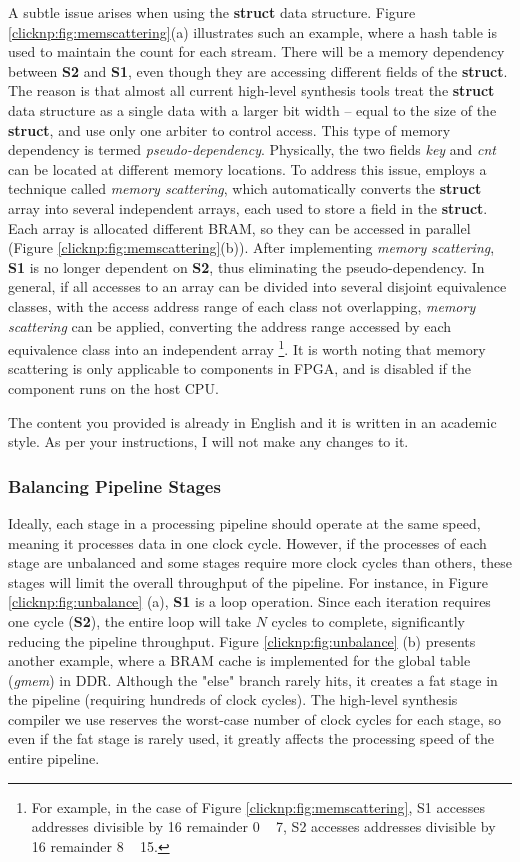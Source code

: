 A subtle issue arises when using the \textbf{struct} data structure. 
Figure \ref{clicknp:fig:memscattering}(a) illustrates such an example, where a hash table is used to maintain the count for each stream. 
There will be a memory dependency between \textbf{S2} and \textbf{S1}, even though they are accessing different fields of the \textbf{struct}. 
The reason is that almost all current high-level synthesis tools treat the \textbf{struct} data structure as a single data with a larger bit width -- equal to the size of the \textbf{struct}, and use only one arbiter to control access. 
This type of memory dependency is termed \textit{pseudo-dependency}. 
Physically, the two fields \textit{key} and \textit{cnt} can be located at different memory locations. 
To address this issue, \name employs a technique called \textit{memory scattering}, which automatically converts the \textbf{struct} array into several independent arrays, each used to store a field in the \textbf{struct}. Each array is allocated different BRAM, so they can be accessed in parallel (Figure \ref{clicknp:fig:memscattering}(b)). 
After implementing \textit{memory scattering}, \textbf{S1} is no longer dependent on \textbf{S2}, thus eliminating the pseudo-dependency. 
In general, if all accesses to an array can be divided into several disjoint equivalence classes, with the access address range of each class not overlapping, \textit{memory scattering} can be applied, converting the address range accessed by each equivalence class into an independent array \footnote{For example, in the case of Figure \ref{clicknp:fig:memscattering}, S1 accesses addresses divisible by 16 remainder 0 ~ 7, S2 accesses addresses divisible by 16 remainder 8 ~ 15.}. 
It is worth noting that memory scattering is only applicable to components in FPGA, and is disabled if the component runs on the host CPU.

The content you provided is already in English and it is written in an academic style. As per your instructions, I will not make any changes to it.

\subsubsection{Balancing Pipeline Stages}
Ideally, each stage in a processing pipeline should operate at the same speed, meaning it processes data in one clock cycle. However, if the processes of each stage are unbalanced and some stages require more clock cycles than others, these stages will limit the overall throughput of the pipeline. For instance, in Figure \ref {clicknp:fig:unbalance} (a), \textbf {S1} is a loop operation. Since each iteration requires one cycle (\textbf {S2}), the entire loop will take $N$ cycles to complete, significantly reducing the pipeline throughput. Figure \ref {clicknp:fig:unbalance} (b) presents another example, where a BRAM cache is implemented for the global table (\textit {gmem}) in DDR. Although the "else" branch rarely hits, it creates a fat stage in the pipeline (requiring hundreds of clock cycles). The high-level synthesis compiler we use reserves the worst-case number of clock cycles for each stage, so even if the fat stage is rarely used, it greatly affects the processing speed of the entire pipeline.

